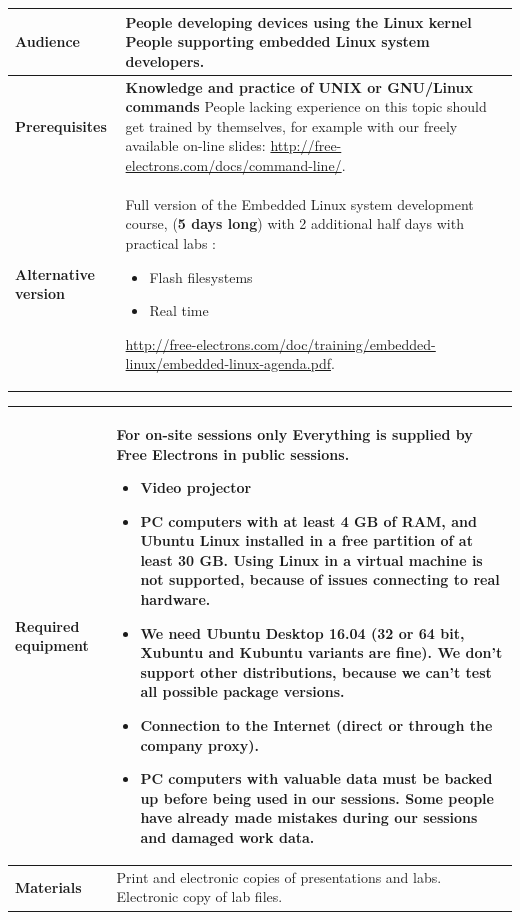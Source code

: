 \documentclass[a4paper,12pt,obeyspaces,spaces,hyphens]{article}
\begin{document}
{\begin{tabularx}{\textwidth}{|g|h|}
    {\bf Audience} & People developing devices using the Linux kernel
    \newline People supporting embedded Linux system developers. \\
    \hline

    {\bf Prerequisites} &
    {\bf Knowledge and practice of UNIX or GNU/Linux commands}
    \newline People lacking experience on this topic should get
    trained by themselves, for example with our freely available
    on-line slides:
    \newline \url{http://free-electrons.com/docs/command-line/}. \\
    \hline

    {\bf Alternative version} & Full version of the Embedded Linux
    system development course, ({\bf 5 days long}) with 2 additional
    half days with practical labs :
    \begin{itemize}
    \item Flash filesystems
    \item Real time
    \end{itemize}
    \url{http://free-electrons.com/doc/training/embedded-linux/embedded-linux-agenda.pdf}. \\
    \hline

  \end{tabularx}

  \begin{tabularx}{\textwidth}{|g|h|}
    {\bf Required equipment} &
    {\bf For on-site sessions only}
    \newline Everything is supplied by Free Electrons in public sessions.
    \begin{itemize}
    \item Video projector
    \item PC computers with at least 4 GB of RAM, and Ubuntu Linux
    installed in a {\bf free partition of at least 30 GB. Using Linux
      in a virtual machine is not supported}, because of issues
    connecting to real hardware.
    \item We need Ubuntu Desktop 16.04 (32 or 64 bit, Xubuntu and
    Kubuntu variants are fine). We don't support other
    distributions, because we can't test all possible package versions.
    \item {\bf Connection to the Internet} (direct or through the
    company proxy).
    \item {\bf PC computers with valuable data must be backed up}
    before being used in our sessions.  Some people have already made
    mistakes during our sessions and damaged work data.
    \end{itemize}\\
    \hline

    {\bf Materials} & Print and electronic copies of presentations and
    labs.
    \newline Electronic copy of lab files.\\
    \hline

\end{tabularx}}
\normalsize
\end{document}

